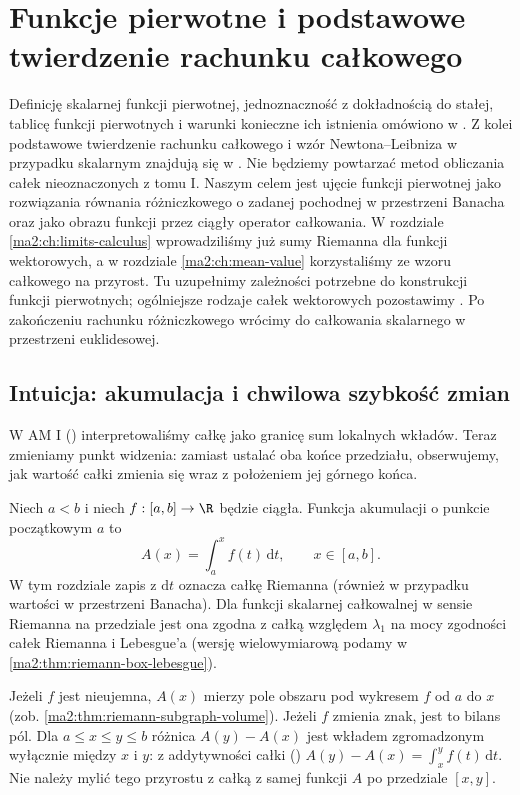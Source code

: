 \chapter{Funkcje pierwotne i podstawowe twierdzenie rachunku całkowego}
\label{ma2:ch:primitives}

Definicję skalarnej funkcji pierwotnej, jednoznaczność
z dokładnością do stałej, tablicę funkcji pierwotnych
i warunki konieczne ich istnienia omówiono w
.
Z kolei podstawowe twierdzenie rachunku całkowego
i wzór Newtona--Leibniza w przypadku skalarnym
znajdują się w
.
Nie będziemy powtarzać metod obliczania całek
nieoznaczonych z tomu I.
Naszym celem jest ujęcie funkcji pierwotnej jako
rozwiązania równania różniczkowego o zadanej
pochodnej w przestrzeni Banacha oraz jako obrazu
funkcji przez ciągły operator całkowania.
W rozdziale \ref{ma2:ch:limits-calculus} wprowadziliśmy
już sumy Riemanna dla funkcji wektorowych,
a w rozdziale \ref{ma2:ch:mean-value} korzystaliśmy
ze wzoru całkowego na przyrost. Tu uzupełnimy
zależności potrzebne do konstrukcji funkcji pierwotnych;
ogólniejsze rodzaje całek wektorowych pozostawimy
.
Po zakończeniu rachunku różniczkowego wrócimy do
całkowania skalarnego w przestrzeni euklidesowej.

\section{Intuicja: akumulacja i chwilowa szybkość zmian}

W AM I
()
interpretowaliśmy całkę jako granicę sum lokalnych
wkładów. Teraz zmieniamy punkt widzenia:
zamiast ustalać oba końce przedziału, obserwujemy,
jak wartość całki zmienia się wraz z położeniem
jej górnego końca.

Niech $a<b$ i niech $f:[a,b]\to\R$ będzie ciągła. Funkcja
akumulacji o punkcie początkowym $a$ to
\[
 A(x)=\int_a^x f(t)\,\mathrm dt,\qquad x\in[a,b].
\]
W tym rozdziale zapis z $\mathrm dt$ oznacza
całkę Riemanna (również w przypadku wartości
w przestrzeni Banacha). Dla funkcji skalarnej
całkowalnej w sensie Riemanna na przedziale
jest ona zgodna z całką względem $\lambda_1$
na mocy zgodności całek Riemanna i Lebesgue'a
(wersję wielowymiarową podamy w
\ref{ma2:thm:riemann-box-lebesgue}).

Jeżeli $f$ jest nieujemna, $A(x)$ mierzy pole
obszaru pod wykresem $f$ od $a$ do $x$
(zob. \ref{ma2:thm:riemann-subgraph-volume}).
Jeżeli $f$ zmienia znak, jest to bilans pól.
Dla $a\le x\le y\le b$ różnica $A(y)-A(x)$
jest wkładem zgromadzonym wyłącznie między
$x$ i $y$: z addytywności całki
()
$A(y)-A(x)=\int_x^y f(t)\,\mathrm dt$.
Nie należy mylić tego przyrostu z całką
z samej funkcji $A$ po przedziale $[x,y]$.

